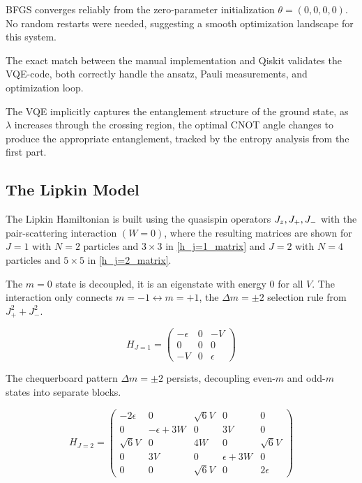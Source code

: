 BFGS converges reliably from the zero-parameter initialization $\theta=(0,0,0,0)$. No random restarts were needed, suggesting a smooth optimization landscape for this system. 

The exact match between the manual implementation and Qiskit validates the VQE-code, both correctly handle the ansatz, Pauli measurements, and optimization loop.

The VQE implicitly captures the entanglement structure of the ground state, as $\lambda$ increases through the crossing region, the optimal CNOT angle changes to produce the appropriate entanglement, tracked by the entropy analysis from the first part. 

\subsection{The Lipkin Model}
\label{subsec:lipkin-model}

The Lipkin Hamiltonian is built using the quasispin operators $J_z,\space J_+,\space J_-$ with the pair-scattering interaction $(W=0)$, where the resulting matrices are shown for $J=1$ with $N=2$ particles and $3\times3$ in \cref{h_j=1_matrix} and $J=2$ with $N=4$ particles and $5\times5$ in \cref{h_j=2_matrix}.

The $m=0$ state is decoupled, it is an eigenstate with energy $0$ for all $V$. The interaction only connects $m=-1 \leftrightarrow m=+1$, the $\Delta m = \pm 2$ selection rule from $J_+^2+J_-^2$.

\begin{equation}\label{h_j=1_matrix}
    H_{J=1} = \begin{pmatrix}
        -\epsilon & 0 & -V \\
        0 & 0 & 0 \\
        -V & 0 & \epsilon
    \end{pmatrix}
\end{equation}

The chequerboard pattern $\Delta m = \pm 2$ persists, decoupling even-$m$ and odd-$m$ states into separate blocks.

\begin{equation}\label{h_j=2_matrix}
    H_{J=2} = 
    \begin{pmatrix}
        -2\epsilon & 0 & \sqrt{6}V & 0 & 0 \\
        0 & -\epsilon + 3W & 0 & 3V & 0 \\
        \sqrt{6}V & 0 & 4W & 0 & \sqrt{6}V \\
        0 & 3V & 0 & \epsilon+3W & 0 \\
        0 & 0 & \sqrt{6}V & 0 & 2\epsilon
    \end{pmatrix}
\end{equation}

